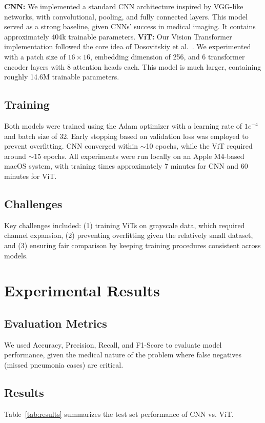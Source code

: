 \documentclass{article}
\begin{document}
\textbf{CNN:} We implemented a standard CNN architecture inspired by VGG-like networks, with convolutional, pooling, and fully connected layers. This model served as a strong baseline, given CNNs' success in medical imaging. It contains approximately 404k trainable parameters.
\textbf{ViT:} Our Vision Transformer implementation followed the core idea of Dosovitskiy et al.~\cite{dosovitskiy2020image}. We experimented with a patch size of $16 \times 16$, embedding dimension of 256, and 6 transformer encoder layers with 8 attention heads each. This model is much larger, containing roughly 14.6M trainable parameters.

\subsection{Training}
Both models were trained using the Adam optimizer with a learning rate of $1e^{-4}$ and batch size of 32. Early stopping based on validation loss was employed to prevent overfitting. CNN converged within $\sim$10 epochs, while the ViT required around $\sim$15 epochs. All experiments were run locally on an Apple M4-based macOS system, with training times approximately 7 minutes for CNN and 60 minutes for ViT.

\subsection{Challenges}
Key challenges included: (1) training ViTs on grayscale data, which required channel expansion, (2) preventing overfitting given the relatively small dataset, and (3) ensuring fair comparison by keeping training procedures consistent across models.

\section{Experimental Results}

\subsection{Evaluation Metrics}
We used Accuracy, Precision, Recall, and F1-Score to evaluate model performance, given the medical nature of the problem where false negatives (missed pneumonia cases) are critical.

\subsection{Results}
Table~\ref{tab:results} summarizes the test set performance of CNN vs. ViT.
\end{document}
